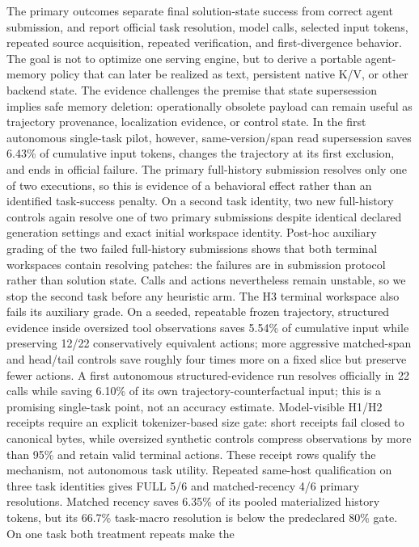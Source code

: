 \documentclass[11pt]{article}
\begin{document}
The primary outcomes separate final solution-state success from correct agent
submission, and report official task resolution, model calls, selected input
tokens, repeated source acquisition, repeated verification, and first-divergence
behavior. The goal is not to optimize one serving engine, but to derive a
portable agent-memory policy that can later be realized as text, persistent
native K/V, or other backend state. The evidence challenges the premise that
state supersession implies safe memory deletion: operationally obsolete payload
can remain useful as trajectory provenance, localization evidence, or control
state. In the first autonomous single-task pilot,
however, same-version/span read supersession saves 6.43\% of cumulative input
tokens, changes the trajectory at its first exclusion, and ends in official
failure. The primary full-history submission resolves only one of two
executions, so this is evidence of a behavioral effect rather than an identified
task-success penalty. On a second task identity, two new full-history controls
again resolve one of two primary submissions despite identical declared
generation settings and exact initial
workspace identity. Post-hoc auxiliary grading of the two failed full-history
submissions shows that both terminal workspaces contain resolving patches: the
failures are in submission protocol rather than solution state. Calls and
actions nevertheless remain unstable, so we stop the second task before any
heuristic arm. The H3 terminal workspace also fails its auxiliary grade.
On a seeded, repeatable frozen trajectory, structured evidence inside oversized
tool observations saves 5.54\% of cumulative input while preserving 12/22
conservatively equivalent actions; more aggressive matched-span and head/tail
controls save roughly four times more on a fixed slice but preserve fewer
actions. A first autonomous structured-evidence run resolves officially in 22
calls while saving 6.10\% of its own trajectory-counterfactual input; this is a
promising single-task point, not an accuracy estimate. Model-visible H1/H2
receipts require an explicit tokenizer-based size
gate: short receipts fail closed to canonical bytes, while oversized synthetic
controls compress observations by more than 95\% and retain valid terminal
actions. These receipt rows qualify the mechanism, not autonomous task utility.
Repeated same-host qualification on three task identities gives FULL 5/6 and
matched-recency 4/6 primary resolutions. Matched recency saves 6.35\% of its
pooled materialized history tokens, but its 66.7\% task-macro resolution is
below the predeclared 80\% gate. On one task both treatment repeats make the
\end{document}
